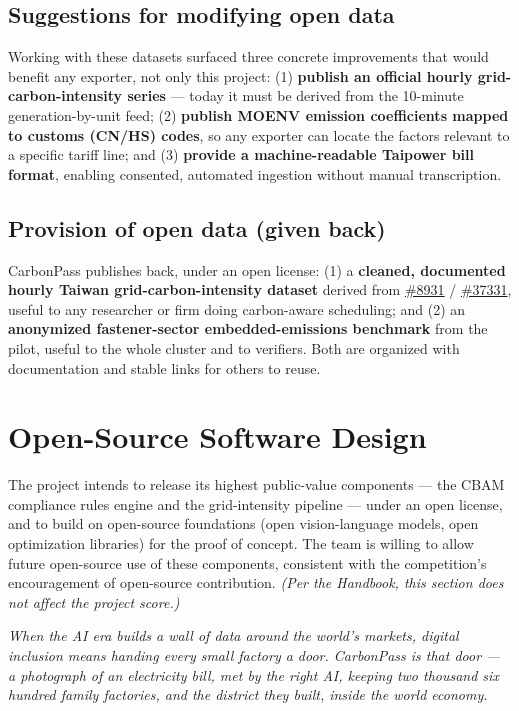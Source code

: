 \subsection{Suggestions for modifying open data}\label{sec:improve}

Working with these datasets surfaced three concrete improvements that would
benefit any exporter, not only this project: (1) \textbf{publish an official
hourly grid-carbon-intensity series} --- today it must be derived from the
10-minute generation-by-unit feed; (2) \textbf{publish MOENV emission
coefficients mapped to customs (CN/HS) codes}, so any exporter can locate the
factors relevant to a specific tariff line; and (3) \textbf{provide a
machine-readable Taipower bill format}, enabling consented, automated ingestion
without manual transcription.

\subsection{Provision of open data (given back)}\label{sec:giveback}

CarbonPass publishes back, under an open license: (1) a \textbf{cleaned,
documented hourly Taiwan grid-carbon-intensity dataset} derived from
\href{https://data.gov.tw/en/datasets/8931}{\#8931} /
\href{https://data.gov.tw/en/datasets/37331}{\#37331}, useful to any
researcher or firm doing carbon-aware scheduling; and (2) an \textbf{anonymized
fastener-sector embedded-emissions benchmark} from the pilot, useful to the
whole cluster and to verifiers. Both are organized with documentation and
stable links for others to reuse.

\section{Open-Source Software Design}\label{sec:oss}

The project intends to release its highest public-value components --- the CBAM
compliance rules engine and the grid-intensity pipeline --- under an open
license, and to build on open-source foundations (open vision-language models,
open optimization libraries) for the proof of concept. The team is willing to
allow future open-source use of these components, consistent with the
competition's encouragement of open-source contribution. \emph{(Per the
Handbook, this section does not affect the project score\cite{handbook}.)}

\vspace{5mm}
\begin{center}
\begin{minipage}{0.86\textwidth}
\centering\itshape\color{ink!85}
When the AI era builds a wall of data around the world's markets, digital
inclusion means handing every small factory a door. CarbonPass is that door ---
a photograph of an electricity bill, met by the right AI, keeping two thousand
six hundred family factories, and the district they built, inside the world
economy.
\end{minipage}
\end{center}
